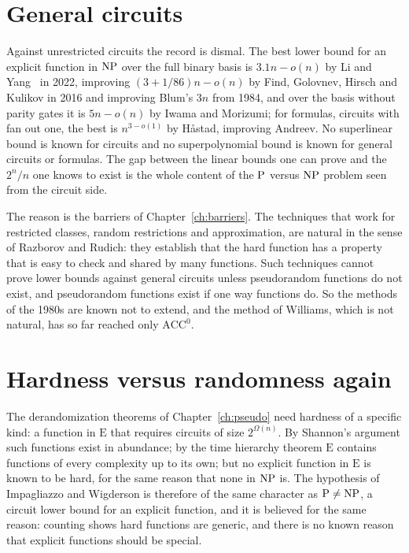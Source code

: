 \section{General circuits}

Against unrestricted circuits the record is dismal. The best lower bound for an explicit function in $\mathrm{NP}$ over the full binary basis is $3.1 n - o(n)$ by Li and Yang~\cite{LiYang} in 2022, improving $(3 + 1/86) n - o(n)$ by Find, Golovnev, Hirsch and Kulikov in 2016 and improving Blum's $3n$ from 1984, and over the basis without parity gates it is $5n - o(n)$ by Iwama and Morizumi; for formulas, circuits with fan out one, the best is $n^{3 - o(1)}$ by H{\aa}stad, improving Andreev. No superlinear bound is known for circuits and no superpolynomial bound is known for general circuits or formulas. The gap between the linear bounds one can prove and the $2^n / n$ one knows to exist is the whole content of the $\mathrm{P}$ versus $\mathrm{NP}$ problem seen from the circuit side.

The reason is the barriers of Chapter~\ref{ch:barriers}. The techniques that work for restricted classes, random restrictions and approximation, are natural in the sense of Razborov and Rudich: they establish that the hard function has a property that is easy to check and shared by many functions. Such techniques cannot prove lower bounds against general circuits unless pseudorandom functions do not exist, and pseudorandom functions exist if one way functions do. So the methods of the 1980s are known not to extend, and the method of Williams, which is not natural, has so far reached only $\mathrm{ACC}^0$.

\section{Hardness versus randomness again}

The derandomization theorems of Chapter~\ref{ch:pseudo} need hardness of a specific kind: a function in $\mathrm{E}$ that requires circuits of size $2^{\Omega(n)}$. By Shannon's argument such functions exist in abundance; by the time hierarchy theorem $\mathrm{E}$ contains functions of every complexity up to its own; but no explicit function in $\mathrm{E}$ is known to be hard, for the same reason that none in $\mathrm{NP}$ is. The hypothesis of Impagliazzo and Wigderson is therefore of the same character as $\mathrm{P} \neq \mathrm{NP}$, a circuit lower bound for an explicit function, and it is believed for the same reason: counting shows hard functions are generic, and there is no known reason that explicit functions should be special.

